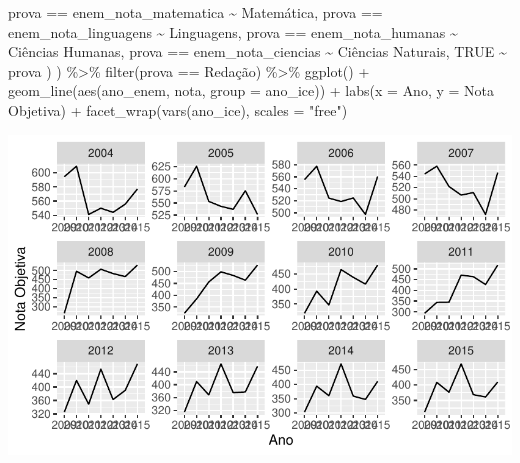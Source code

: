 \documentclass[
  letterpaper,
  DIV=11,
  numbers=noendperiod]{scrartcl}
\newenvironment{Shaded}{\begin{snugshade}}{\end{snugshade}}
\newcommand{\AttributeTok}[1]{\textcolor[rgb]{0.40,0.45,0.13}{#1}}
\newcommand{\ConstantTok}[1]{\textcolor[rgb]{0.56,0.35,0.01}{#1}}
\newcommand{\FunctionTok}[1]{\textcolor[rgb]{0.28,0.35,0.67}{#1}}
\newcommand{\NormalTok}[1]{\textcolor[rgb]{0.00,0.23,0.31}{#1}}
\newcommand{\SpecialCharTok}[1]{\textcolor[rgb]{0.37,0.37,0.37}{#1}}
\newcommand{\StringTok}[1]{\textcolor[rgb]{0.13,0.47,0.30}{#1}}
\begin{document}
\begin{Shaded}
\begin{Highlighting}[]
\NormalTok{      prova }\SpecialCharTok{==} \StringTok{\textquotesingle{}enem\_nota\_matematica\textquotesingle{}} \SpecialCharTok{\textasciitilde{}} \StringTok{\textquotesingle{}Matemática\textquotesingle{}}\NormalTok{,}
\NormalTok{      prova }\SpecialCharTok{==} \StringTok{\textquotesingle{}enem\_nota\_linguagens\textquotesingle{}} \SpecialCharTok{\textasciitilde{}} \StringTok{\textquotesingle{}Linguagens\textquotesingle{}}\NormalTok{,}
\NormalTok{      prova }\SpecialCharTok{==} \StringTok{\textquotesingle{}enem\_nota\_humanas\textquotesingle{}} \SpecialCharTok{\textasciitilde{}} \StringTok{\textquotesingle{}Ciências Humanas\textquotesingle{}}\NormalTok{,}
\NormalTok{      prova }\SpecialCharTok{==} \StringTok{\textquotesingle{}enem\_nota\_ciencias\textquotesingle{}} \SpecialCharTok{\textasciitilde{}} \StringTok{\textquotesingle{}Ciências Naturais\textquotesingle{}}\NormalTok{,}
      \ConstantTok{TRUE} \SpecialCharTok{\textasciitilde{}}\NormalTok{ prova}
\NormalTok{    )}
\NormalTok{  ) }\SpecialCharTok{\%\textgreater{}\%}
  \FunctionTok{filter}\NormalTok{(prova }\SpecialCharTok{==} \StringTok{\textquotesingle{}Redação\textquotesingle{}}\NormalTok{) }\SpecialCharTok{\%\textgreater{}\%} 
  \FunctionTok{ggplot}\NormalTok{() }\SpecialCharTok{+}
  \FunctionTok{geom\_line}\NormalTok{(}\FunctionTok{aes}\NormalTok{(ano\_enem, nota, }\AttributeTok{group =}\NormalTok{ ano\_ice)) }\SpecialCharTok{+}
  \FunctionTok{labs}\NormalTok{(}\AttributeTok{x =} \StringTok{\textquotesingle{}Ano\textquotesingle{}}\NormalTok{, }\AttributeTok{y =} \StringTok{\textquotesingle{}Nota Objetiva\textquotesingle{}}\NormalTok{) }\SpecialCharTok{+}
  \FunctionTok{facet\_wrap}\NormalTok{(}\FunctionTok{vars}\NormalTok{(ano\_ice), }\AttributeTok{scales =} \StringTok{"free"}\NormalTok{)}
\end{Highlighting}
\end{Shaded}

\includegraphics{script_files/figure-latex/unnamed-chunk-11-2.pdf}
\end{document}
